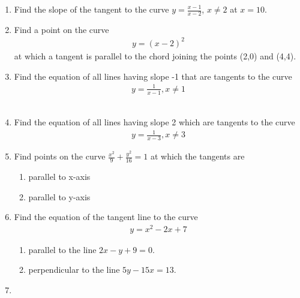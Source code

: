 \begin{enumerate}[label=\thesubsection.\arabic*,ref=\thesubsection.\theenumi]
\item Find the slope of the tangent to the curve $y = \frac{x-1}{x-2}$, $x \neq 2$ at $x=10$.
	\\
\solution 
\label{chapters/12/6/3/2}

\item 
		Find a point on the curve \begin{align}y=(x-2)^2\end{align} at which a tangent is parallel to the chord joining the points (2,0) and (4,4).
			\\
			\solution 
\label{chapters/12/6/3/8}

\item 
Find the equation of all lines having slope  -1 that are tangents to the curve
\begin{align}
y = \frac{1}{x-1}, x \neq 1
\label{chapters/12/6/3/10}
\end{align}
	\\
	\solution 

\item 
Find the equation of all lines having slope 2 which are tangents to the curve 
\begin{align}
y=\frac{1}{x-3}, x\neq{3} 
\end{align}
\solution 
\label{chapters/12/6/3/11}

\item 
 Find points on the curve $\frac{x^2}{9}+\frac{y^2}{16}=1$ at which the tangents are 
 \begin{enumerate}
	 \item parallel to x-axis\\  
	 \item parallel to y-axis
 \end{enumerate}
 \solution 
\label{chapters/12/6/3/13}

\item 
Find the equation of the tangent line to the curve
\begin{align}
y=x^2-2x+7
\end{align}
\begin{enumerate}
    \item parallel to the line $2x-y+9=0$.
    \item perpendicular to the line $5y-15x=13$.
\end{enumerate}
\solution
\label{chapters/12/6/3/15}

\item 

\end{enumerate}
